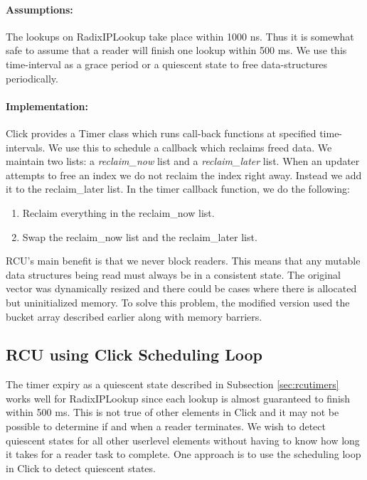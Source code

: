 \documentclass[a4paper,marginparwidth=50pt,marginparsep=10pt]{article}
\begin{document}
\paragraph{Assumptions:}
The lookups on RadixIPLookup take place within 1000 ns. Thus it is somewhat safe to assume that a reader will finish one lookup within 500 ms.
We use this time-interval as a grace period or a quiescent state to free data-structures periodically.
\paragraph{Implementation:}
Click provides a Timer class which runs call-back functions at specified time-intervals. We use this to schedule a callback which reclaims freed data.
We maintain two lists: a \emph{reclaim\_now} list and a \emph{reclaim\_later} list. When an updater attempts to free an index we do not reclaim the index right away. Instead we add it to the reclaim\_later list.
In the timer callback function, we do the following:
\begin{enumerate}
\item Reclaim everything in the reclaim\_now list.
\item Swap the reclaim\_now list and the reclaim\_later list.
\end{enumerate}

RCU's main benefit is that we never block readers. This means that any mutable data structures being read must always be in a consistent state. The original vector was dynamically resized and there could be cases where there is allocated but uninitialized memory. To solve this problem, the modified version used the bucket array described earlier along with memory barriers. 
\subsection{RCU using Click Scheduling Loop}
\label{rcuschedloop}
The timer expiry as a quiescent state described in Subsection \ref{sec:rcutimers} works well for RadixIPLookup since each lookup is almost guaranteed to finish within 500 ms. This is not true of other elements in Click and it may not be possible to determine if and when a reader terminates. We wish to detect quiescent states for all other userlevel elements without having to know how long it takes for a reader task to complete. One approach is to use the scheduling loop in Click to detect quiescent states.
\end{document}

